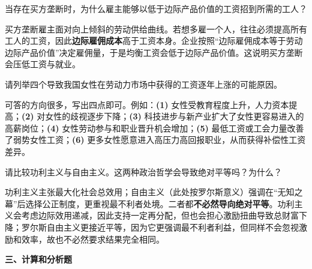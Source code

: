\begin{question}
当存在买方垄断时，为什么雇主能够以低于边际产品价值的工资招到所需的工人？
\begin{solution}
买方垄断雇主面对向上倾斜的劳动供给曲线。若想多雇一个人，往往必须提高所有工人的工资，因此\textbf{边际雇佣成本}高于工资本身。企业按照“边际雇佣成本等于劳动边际产品价值”决定雇佣量，于是均衡工资会低于边际产品价值。这说明买方垄断会压低工资与就业。\end{solution}
\end{question}

\begin{question}
请列举四个导致我国女性在劳动力市场中获得的工资逐年上涨的可能原因。
\begin{solution}
可答的方向很多，写出四点即可。例如：\textbf{(1)} 女性受教育程度上升，人力资本提高；\textbf{(2)} 对女性的歧视逐步下降；\textbf{(3)} 科技进步与新产业扩大了女性更容易进入的高薪岗位；\textbf{(4)} 女性劳动参与和职业晋升机会增加；\textbf{(5)} 最低工资或工会力量改善了弱势女性工资；\textbf{(6)} 更多女性愿意进入高压力高回报职业，从而获得补偿性工资差异。\end{solution}
\end{question}

\begin{question}
请比较功利主义与自由主义。这两种政治哲学会导致绝对平等吗？为什么？
\begin{solution}
功利主义主张最大化社会总效用；自由主义（此处按罗尔斯意义）强调在“无知之幕”后选择公正制度，更重视最不利者处境。二者都\textbf{不必然导向绝对平等}。功利主义会考虑边际效用递减，因此支持一定再分配，但也会担心激励扭曲导致总财富下降；罗尔斯自由主义更接近平等，因为它更强调最不利者利益，但同样不会忽视激励和效率，故也不必然要求结果完全相同。\end{solution}
\end{question}

\textbf{三、计算和分析题}

